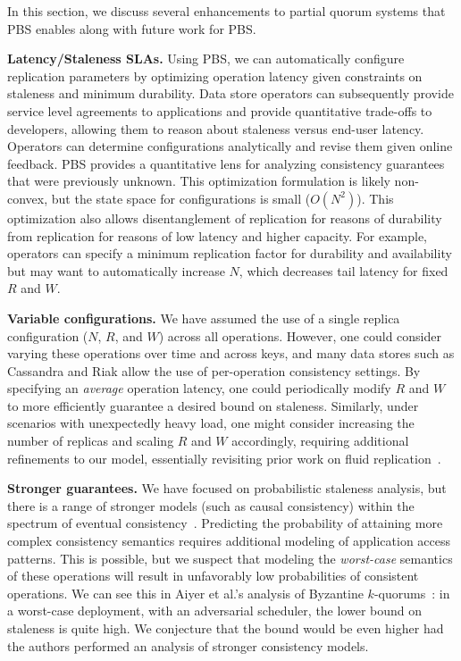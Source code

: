 \documentclass{vldb}
\begin{document}
In this section, we discuss several enhancements to partial
quorum systems that PBS enables along with future work for PBS.

\textbf{Latency/Staleness SLAs.} Using PBS, we can automatically
configure replication parameters by optimizing operation latency given
constraints on staleness and minimum durability.  Data store operators
can subsequently provide service level agreements to applications and
provide quantitative trade-offs to developers, allowing them to reason
about staleness versus end-user latency.  Operators can determine
configurations analytically and revise them given online feedback.
PBS provides a quantitative lens for analyzing consistency guarantees
that were previously unknown.  This optimization formulation is likely
non-convex, but the state space for configurations is small
($O(N^2)$).  This optimization also allows disentanglement of
replication for reasons of durability from replication for reasons of
low latency and higher capacity.  For example, operators can specify a
minimum replication factor for durability and availability but may
want to automatically increase $N$, which decreases tail latency for
fixed $R$ and $W$.

\textbf{Variable configurations.} We have assumed the use of a single
replica configuration ($N$, $R$, and $W$) across all operations.
However, one could consider varying these operations over time and
across keys, and many data stores such as Cassandra and Riak allow the use of
per-operation consistency settings.  By specifying an \textit{average}
operation latency, one could periodically modify $R$ and $W$ to more
efficiently guarantee a desired bound on staleness.  Similarly, under
scenarios with unexpectedly heavy load, one might consider increasing
the number of replicas and scaling $R$ and $W$ accordingly, requiring
additional refinements to our model, essentially revisiting prior work
on fluid replication~\cite{fluidreplication}.

\textbf{Stronger guarantees.} We have focused on probabilistic
staleness analysis, but there is a range of stronger models (such as
causal consistency) within the spectrum of eventual
consistency~\cite{vogels-defs}.  Predicting the probability of
attaining more complex consistency semantics requires additional
modeling of application access patterns.  This is possible, but we
suspect that modeling the \textit{worst-case} semantics of these
operations will result in unfavorably low probabilities of consistent
operations.  We can see this in Aiyer et al.'s analysis of Byzantine
$k$-quorums~\cite{multi-k-quorum}: in a worst-case deployment, with an
adversarial scheduler, the lower bound on staleness is quite high.  We
conjecture that the bound would be even higher had the authors
performed an analysis of stronger consistency models.
\end{document}
